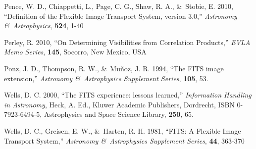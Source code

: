 \documentclass[twoside]{article}
\begin{document}
\begin{thebibliography}{99}
  Pence, W. D., Chiappetti, L., Page, C. G., Shaw, R. A., \&\ Stobie,
  E. 2010, ``Definition of the Flexible Image Transport System,
  version 3.0,'' {\it Astronomy \&\ Astrophysics}, {\bf 524}, 1-40

   Perley, R. 2010, ``On Determining Visibilities from Correlation
   Products,'' {\it EVLA Memo Series}, {\bf 145}, Socorro, New Mexico,
   USA

   Ponz, J. D., Thompson, R. W., \&\ Mu\~noz, J. R. 1994, ``The FITS
   image extension,'' {\it Astronomy \&\ Astrophysics Supplement
     Series}, {\bf 105}, 53.

   Wells, D. C. 2000, ``The FITS experience: lessons learned,'' {\it
   Information Handling in Astronomy}, Heck, A. Ed., Kluwer Academic
   Publishers, Dordrecht, ISBN 0-7923-6494-5, Astrophysics and Space
   Science Library, {\bf 250}, 65.

  Wells, D. C., Greisen, E. W., \&\ Harten, R. H. 1981, ``FITS: A
  Flexible Image Transport System,'' {\it Astronomy \&\ Astrophysics
  Supplement Series}, {\bf 44}, 363-370

\end{thebibliography}
\end{document}
